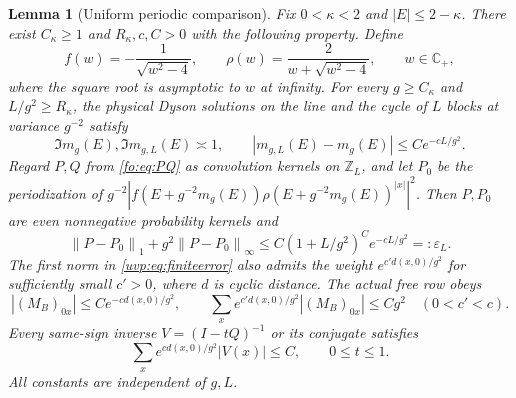 \documentclass[11pt]{article}
\numberwithin{equation}{section}
\newtheorem{lemma}[theorem]{Lemma}
\theoremstyle{remark}
\newcommand{\Z}{\mathbb Z}
\newcommand{\C}{\mathbb C}
\newcommand{\norm}[1]{\left\|#1\right\|}
\begin{document}
\begin{lemma}[Uniform periodic comparison]\label{uvp:prop:finite}
Fix $0<\kappa<2$ and $|E|\le2-\kappa$. There exist $C_\kappa\ge1$
and $R_\kappa,c,C>0$ with the following property.
Define
\[
 f(w)=-\frac1{\sqrt{w^2-4}},\qquad
 \rho(w)=\frac2{w+\sqrt{w^2-4}},\qquad w\in\C_+,
\]
where the square root is asymptotic to $w$ at infinity.
For every $g\ge C_\kappa$ and $L/g^2\ge R_\kappa$, the physical
Dyson solutions on the line and the cycle of $L$ blocks at variance $g^{-2}$ satisfy
\[
 \Im m_g(E),\Im m_{g,L}(E)\asymp1,\qquad
 |m_{g,L}(E)-m_g(E)|\le C e^{-cL/g^2}.
\]
Regard $P,Q$ from \eqref{fo:eq:PQ} as convolution kernels on $\Z_L$,
and let $P_0$ be the periodization of
$g^{-2}|f(E+g^{-2}m_g(E))\rho(E+g^{-2}m_g(E))^{|x|}|^2$.
Then $P,P_0$ are even nonnegative probability kernels and
\begin{equation}\label{uvp:eq:finiteerror}
 \norm{P-P_0}_1+g^2\norm{P-P_0}_\infty
 \le C(1+L/g^2)^C e^{-cL/g^2}=:\varepsilon_L.
\end{equation}
The first norm in \eqref{uvp:eq:finiteerror} also admits the weight
$e^{c'd(x,0)/g^2}$ for sufficiently small $c'>0$, where $d$ is cyclic
distance. The actual free row obeys
\begin{equation}\label{da:eq:uniform-free-row}
 |(M_B)_{0x}|\le Ce^{-cd(x,0)/g^2},\qquad
 \sum_x e^{c'd(x,0)/g^2}|(M_B)_{0x}|\le Cg^2
 \quad(0<c'<c).
\end{equation}
Every same-sign inverse $V=(I-tQ)^{-1}$ or its conjugate satisfies
\begin{equation}\label{uvp:eq:stable}
 \sum_x e^{c d(x,0)/g^2}|V(x)|\le C,\qquad 0\le t\le1.
\end{equation}
All constants are independent of $g,L$.
\end{lemma}
\end{document}
